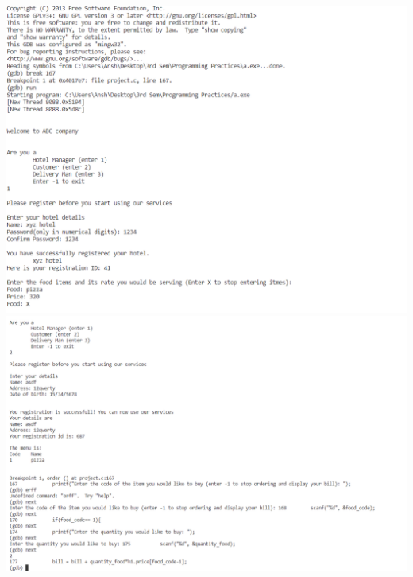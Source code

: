 \documentclass[12pt]{article}
\begin{document}
\includegraphics{gdb_1.png}\\
\includegraphics{gdb_2.png}\\

\end{document}
